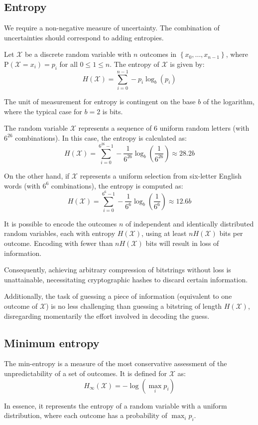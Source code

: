 \subsection{Entropy}
We require a non-negative measure of uncertainty. 
The combination of uncertainties should correspond to adding entropies.
\begin{definition}
    Let $\mathcal{X}$ be a discrete random variable with $n$ outcomes in $\left\{ x_0,\dots,x_{n-1} \right\}$, where $\text{P}(\mathcal{X}=x_i)=p_i$ for all $0 \leq 1 \leq n$. 
    The entropy of $\mathcal{X}$ is given by:
    \[H(\mathcal{X})=\sum_{i=0}^{n-1}-p_i\log_b\left(p_i\right)\]
\end{definition}
The unit of measurement for entropy is contingent on the base $b$ of the logarithm, where the typical case for $b = 2$ is bits.
\begin{example}
    The random variable $\mathcal{X}$ represents a sequence of 6 uniform random letters (with $6^{26}$ combinations). 
    In this case, the entropy is calculated as:
    \[H(\mathcal{X})=\sum_{i=0}^{6^{26}-1}-\dfrac{1}{6^{26}}\log_b\left(\dfrac{1}{6^{26}}\right)\approx 28.2b\]

    On the other hand, if $\mathcal{X}$ represents a uniform selection from six-letter English words (with $6^{6}$ combinations), the entropy is computed as:
    \[H(\mathcal{X})=\sum_{i=0}^{6^{6}-1}-\dfrac{1}{6^{6}}\log_b\left(\dfrac{1}{6^{6}}\right)\approx 12.6b\]
\end{example}

\begin{theorem}
    It is possible to encode the outcomes $n$ of independent and identically distributed random variables, each with entropy $H(\mathcal{X})$, using at least $nH(\mathcal{X})$ bits per outcome. 
    Encoding with fewer than $nH(\mathcal{X})$ bits will result in loss of information.
\end{theorem}
Consequently, achieving arbitrary compression of bitstrings without loss is unattainable, necessitating cryptographic hashes to discard certain information.

Additionally, the task of guessing a piece of information (equivalent to one outcome of $\mathcal{X}$) is no less challenging than guessing a bitstring of length $H(\mathcal{X})$, disregarding momentarily the effort involved in decoding the guess.

\subsection{Minimum entropy}
\begin{definition}
    The min-entropy is a measure of the most conservative assessment of the unpredictability of a set of outcomes.
    It is defined for $\mathcal{X}$ as:
    \[H_\infty(\mathcal{X})=-\log(\max_ip_i)\]
\end{definition}
In essence, it represents the entropy of a random variable with a uniform distribution, where each outcome has a probability of $\max_ip_i$.

